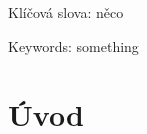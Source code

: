 \documentclass[FM,DP]{tulthesis}
\begin{document}

\begin{abstractCZ}


Klíčová slova: něco

\end{abstractCZ}

\vspace{2cm}

\begin{abstractEN}

Keywords: something

\end{abstractEN}

\tableofcontents

\clearpage

\chapter*{Úvod}

	
\begin{thebibliography}{Per00}

\end{thebibliography}
\end{document}

